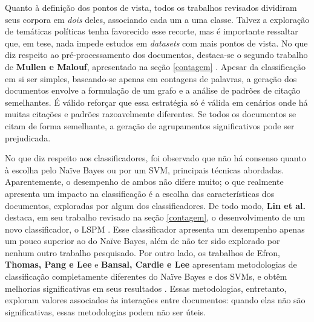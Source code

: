 Quanto à definição dos pontos de vista, todos os trabalhos revisados dividiram seus corpora em \emph{dois} deles, associando cada um a uma classe.  Talvez a exploração de temáticas políticas tenha favorecido esse recorte, mas é importante ressaltar que, em tese, nada impede estudos em \emph{datasets} com mais pontos de vista. No que diz respeito ao pré-processamento dos documentos, destaca-se o segundo trabalho de \textbf{Mullen e Malouf}, apresentado na seção \ref{contagem} \cite{malouf-taking_sides}. Apesar da classificação em si ser simples, baseando-se apenas em contagens de palavras, a geração dos documentos envolve a formulação de um grafo e a análise de padrões de citação semelhantes. É válido reforçar que essa estratégia só é válida em cenários onde há muitas citações e padrões razoavelmente diferentes. Se todos os documentos se citam de forma semelhante, a geração de agrupamentos significativos pode ser prejudicada. 

No que diz respeito aos classificadores, foi observado que não há consenso quanto à escolha pelo Naïve Bayes ou por um SVM, principais técnicas abordadas. Aparentemente, o desempenho de ambos não difere muito; o que realmente apresenta um impacto na classificação é a escolha das características dos documentos, exploradas por algum dos classificadores. De todo modo, \textbf{Lin et al.} destaca, em seu trabalho revisado na seção \ref{contagem}, o desenvolvimento de um novo classificador, o LSPM \cite{lin-et-al2006}. Esse classificador apresenta um desempenho apenas um pouco superior ao do Naïve Bayes, além de não ter sido explorado por nenhum outro trabalho pesquisado. Por outro lado, os trabalhos de Efron, \textbf{Thomas, Pang e Lee} e \textbf{Bansal, Cardie e Lee} apresentam metodologias de classificação completamente diferentes do Naïve Bayes e dos SVMs, e obtêm melhorias significativas em seus resultados \cite{efron, get-out-the-vote, disagree}. Essas metodologias, entretanto, exploram valores associados às interações entre documentos: quando elas não são significativas, essas metodologias podem não ser úteis.  

